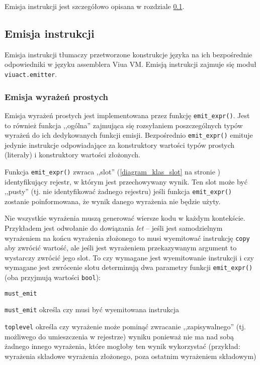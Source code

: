 Emisja instrukcji jest szczegółowo opisana w rozdziale \ref{viuact_cc_impl_desc_emit}.

\subsection{Emisja instrukcji}
\label{viuact_cc_impl_desc_emit}

Emisja instrukcji tłumaczy przetworzone konstrukcje języka \ViuAct\phantom{} na
ich bezpośrednie odpowiedniki w języku assemblera Viua VM. Emisją instrukcji
zajmuje się moduł \texttt{viuact.emitter}.

\subsubsection{Emisja wyrażeń prostych}

Emisja wyrażeń prostych jest implementowana przez funkcję \texttt{emit\_expr()}.
Jest to również funkcja ,,ogólna'' zajmująca się rozsyłaniem poszczególnych
typów wyrażeń do ich dedykowanych funkcji emisji. Bezpośrednio \texttt{emit\_expr()}
emituje jedynie instrukcje odpowiadające za konstruktory wartości typów prostych
(literały) i konstruktory wartości złożonych.

Funkcja \texttt{emit\_expr()} zwraca ,,slot'' (\ref{diagram_klas_slot} na
stronie \pageref{diagram_klas_slot}) identyfikujący rejestr, w którym jest
przechowywany wynik. Ten slot może być ,,pusty'' (tj. nie identyfikować żadnego
rejestru) jeśli funkcja \texttt{emit\_expr()} zostanie poinformowana, że wynik
danego wyrażenia nie będzie użyty.

Nie wszystkie wyrażenia muszą generować wiersze kodu w każdym kontekście.
Przykładem jest odwołanie do dowiązania \emph{let} -- jeśli jest samodzielnym
wyrażeniem na końcu wyrażenia złożonego to musi wyemitować instrukcję
\texttt{copy} aby zwrócić wartość, ale jeśli jest wyrażeniem przekazywanym
argument to wystarczy zwrócić jego slot. To czy wymagane jest wyemitowanie
instrukcji i czy wymagane jest zwrócenie slotu determinują dwa parametry funkcji
\texttt{emit\_expr()} (oba przyjmują wartości \texttt{bool}):

\begin{labeling}{\texttt{must\_emit}}
    \item[\texttt{must\_emit}] określa czy musi być wyemitowana instrukcja
    \item[\texttt{toplevel}] określa czy wyrażenie może pominąć zwracanie
        ,,zapisywalnego'' (tj. możliwego do umieszczenia w rejestrze) wyniku
        ponieważ nie ma nad sobą żadnego innego wyrażenia, które mogłoby ten
        wynik wykorzystać (przykład: wyrażenia składowe wyrażenia złożonego,
        poza ostatnim wyrażeniem składowym)
\end{labeling}

